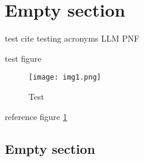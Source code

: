 \section{Empty section}\label{sec:ref}
test cite \cite{poktscan_open_nodate} \cite{gao_framework_2023}
testing acronyms \gls{LLM} \gls{PNF}

test figure

\begin{figure}[H]
    \centering
    \texttt{[image: img1.png]}
    \caption{Test}
    \label{fig:ref}
\end{figure}

reference figure \ref{fig:ref}

\subsection{Empty section}


